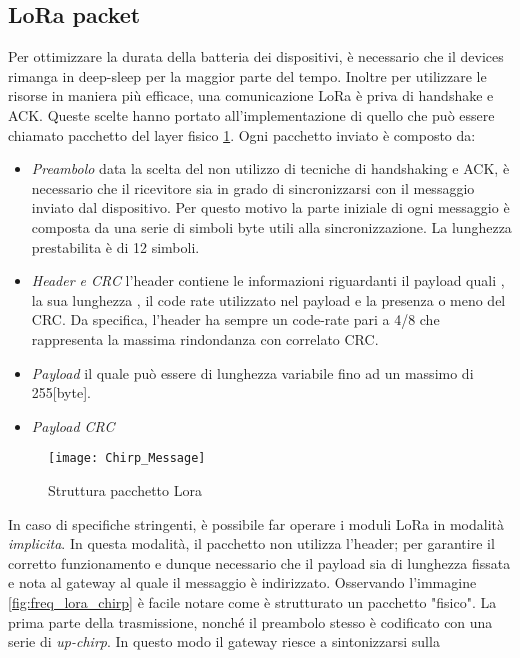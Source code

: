 \subsection{LoRa packet}
Per ottimizzare la durata della batteria dei dispositivi, è necessario che il
devices rimanga in deep-sleep per la maggior parte del tempo. Inoltre per
utilizzare le risorse in maniera più efficace, una comunicazione LoRa è priva di
handshake e ACK. Queste scelte hanno portato all'implementazione di quello che
può essere chiamato pacchetto del layer fisico \ref{fig:phis_pack}.
Ogni pacchetto inviato è composto da:
\begin{itemize}
        \item \emph{Preambolo} data la scelta del non utilizzo di tecniche di
        handshaking e ACK, è necessario che il ricevitore sia in grado di
        sincronizzarsi con il messaggio inviato dal dispositivo. Per questo
        motivo la parte iniziale di ogni messaggio è composta da una serie di
        simboli byte utili alla sincronizzazione. La lunghezza prestabilita è di
        12 simboli.
        \item \emph{Header e CRC} l'header contiene le informazioni riguardanti
        il payload quali , la sua lunghezza , il code rate utilizzato nel
        payload e la presenza o meno del CRC. Da specifica, l'header ha sempre
        un code-rate pari a 4/8 che rappresenta la massima rindondanza con
        correlato CRC. 
        \item \emph{Payload} il quale può essere di lunghezza variabile fino ad
        un massimo di 255[byte].
        \item \emph{Payload CRC}
\end{itemize}
\begin{figure}[h]
        \centering 
                \texttt{[image: Chirp\_Message]}
        \caption{Struttura pacchetto Lora }
        \label{fig:phis_pack}
\end{figure}
In caso di specifiche stringenti, è possibile far operare i moduli LoRa in
modalità \emph{implicita}. In questa modalità, il pacchetto non utilizza
l'header; per garantire il corretto funzionamento e dunque necessario che il
payload sia di lunghezza fissata e nota al gateway al quale il messaggio è
indirizzato.
Osservando l'immagine \ref{fig:freq_lora_chirp}  è facile notare come è
strutturato un pacchetto "fisico".
La prima parte della trasmissione, nonché il preambolo  stesso è codificato con una
serie di \emph{up-chirp}. In questo modo il gateway riesce a sintonizzarsi sulla
